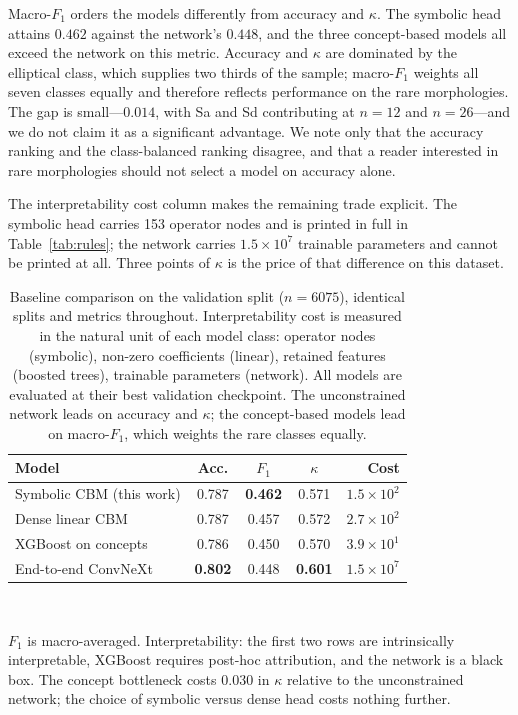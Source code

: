 \documentclass[11pt]{article}
\newcommand{\kappastat}{\ensuremath{\kappa}}
\begin{document}
Macro-$F_1$ orders the models differently from accuracy and $\kappa$. The
symbolic head attains $0.462$ against the network's $0.448$, and the three
concept-based models all exceed the network on this metric. Accuracy and
$\kappa$ are dominated by the elliptical class, which supplies two thirds of
the sample; macro-$F_1$ weights all seven classes equally and therefore
reflects performance on the rare morphologies. The gap is small---$0.014$,
with Sa and Sd contributing at $n=12$ and $n=26$---and we do not claim it as a
significant advantage. We note only that the accuracy ranking and the
class-balanced ranking disagree, and that a reader interested in rare
morphologies should not select a model on accuracy alone.

The interpretability cost column makes the remaining trade explicit. The
symbolic head carries 153 operator nodes and is printed in full in
Table~\ref{tab:rules}; the network carries $1.5\times10^{7}$ trainable
parameters and cannot be printed at all. Three points of $\kappa$ is the price
of that difference on this dataset.

\begin{table}[htbp]
\centering
\caption{Baseline comparison on the validation split ($n=6075$), identical
splits and metrics throughout. Interpretability cost is measured in the
natural unit of each model class: operator nodes (symbolic), non-zero
coefficients (linear), retained features (boosted trees), trainable
parameters (network). All models are evaluated at their best validation
checkpoint. The unconstrained network leads on accuracy and $\kappa$; the
concept-based models lead on macro-$F_1$, which weights the rare classes
equally.}
\label{tab:baselines}
\small
\setlength{\tabcolsep}{5pt}
\begin{tabular}{lcccr}
\toprule
Model & Acc. & $F_1$ & \kappastat & Cost \\
\midrule
Symbolic CBM (this work) & 0.787 & \textbf{0.462} & 0.571 & $1.5\times10^{2}$ \\
Dense linear CBM         & 0.787 & 0.457 & 0.572 & $2.7\times10^{2}$ \\
XGBoost on concepts      & 0.786 & 0.450 & 0.570 & $3.9\times10^{1}$ \\
End-to-end ConvNeXt      & \textbf{0.802} & 0.448 & \textbf{0.601} & $1.5\times10^{7}$ \\
\bottomrule
\end{tabular}
\\[2pt]
\parbox{\columnwidth}{\footnotesize $F_1$ is macro-averaged. Interpretability:
the first two rows are intrinsically interpretable, XGBoost requires post-hoc
attribution, and the network is a black box. The concept bottleneck costs
$0.030$ in $\kappa$ relative to the unconstrained network; the choice of
symbolic versus dense head costs nothing further.}
\end{table}
\end{document}
